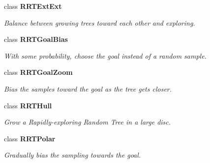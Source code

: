 \begin{CompactItemize}
class {\bf RRTExt\-Ext}
\begin{CompactList}\small\item\em Balance between growing trees toward each other and exploring.\item\end{CompactList}\item 
class {\bf RRTGoal\-Bias}
\begin{CompactList}\small\item\em With some probability, choose the goal instead of a random sample.\item\end{CompactList}\item 
class {\bf RRTGoal\-Zoom}
\begin{CompactList}\small\item\em Bias the samples toward the goal as the tree gets closer.\item\end{CompactList}\item 
class {\bf RRTHull}
\begin{CompactList}\small\item\em Grow a Rapidly-exploring Random Tree in a large disc.\item\end{CompactList}\item 
class {\bf RRTPolar}
\begin{CompactList}\small\item\em Gradually bias the sampling towards the goal.\item\end{CompactList}\end{CompactItemize}
